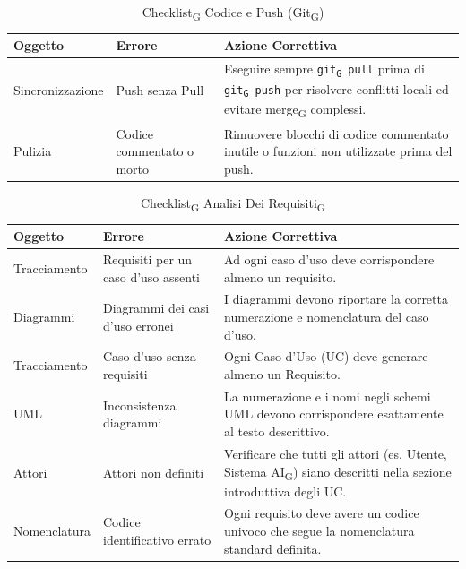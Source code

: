 \documentclass[11pt,a4paper]{article}
\newcommand{\gls}[1]{#1\textsubscript{G}}
\begin{document}
\begin{table}[H]
    \centering
    \renewcommand{\arraystretch}{1.4}
    \begin{tabular}{|l|>{\raggedright\arraybackslash}p{}|>{\raggedright\arraybackslash}p{}|}
        \hline
        \textbf{Oggetto} & \textbf{Errore} & \textbf{Azione Correttiva} \\
        \hline
        Sincronizzazione & Push senza Pull & Eseguire sempre \texttt{\gls{git} pull} prima di \texttt{\gls{git} push} per risolvere conflitti locali ed evitare \gls{merge} complessi. \\
        \hline
        Pulizia & Codice commentato o morto & Rimuovere blocchi di codice commentato inutile o funzioni non utilizzate prima del push. \\
        \hline
    \end{tabular}
    \caption{\gls{Checklist} Codice e Push (\gls{Git})}
\end{table}

\begin{table}[H]
    \centering
    \renewcommand{\arraystretch}{1.4}
    \begin{tabular}{|l|>{\raggedright\arraybackslash}p{}|>{\raggedright\arraybackslash}p{}|}
        \hline
        \textbf{Oggetto} & \textbf{Errore} & \textbf{Azione Correttiva} \\
        \hline
        Tracciamento & Requisiti per un caso d'uso assenti & Ad ogni caso d'uso deve corrispondere almeno un requisito. \\
        \hline
        Diagrammi & Diagrammi dei casi d'uso erronei & I diagrammi devono riportare la corretta numerazione e nomenclatura del caso d'uso. \\
        \hline
        Tracciamento & Caso d'uso senza requisiti & Ogni Caso d'Uso (UC) deve generare almeno un Requisito. \\
        \hline
        UML & Inconsistenza diagrammi & La numerazione e i nomi negli schemi UML devono corrispondere esattamente al testo descrittivo. \\
        \hline
        Attori & Attori non definiti & Verificare che tutti gli attori (es. Utente, \gls{Sistema AI}) siano descritti nella sezione introduttiva degli UC. \\
        \hline
        Nomenclatura & Codice identificativo errato & Ogni requisito deve avere un codice univoco che segue la nomenclatura standard definita. \\
        \hline
    \end{tabular}
    \caption{\gls{Checklist} \gls{Analisi Dei Requisiti}}
\end{table}
\end{document}
